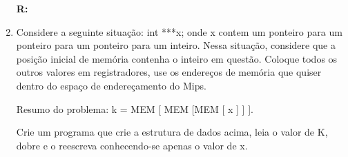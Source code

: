 \documentclass[a4paper,11pt]{article}
\begin{document}
\begin{enumerate}
        \textbf{R: }
        
        \newpage
    \item{Considere a seguinte situação:\newline
            int ***x;\newline
            onde x contem um ponteiro para um ponteiro para um ponteiro para um inteiro.\newline 
            Nessa situação, considere que a posição inicial de memória contenha o inteiro em questão.
            Coloque todos os outros valores em registradores, use os endereços de memória que quiser 
            dentro do espaço de endereçamento do Mips.

            Resumo do problema:\newline
            k = MEM [ MEM [MEM [  x ] ] ].

            Crie um programa que crie a estrutura de dados acima, leia o  valor de K, dobre e 
            o reescreva conhecendo-se apenas o valor de x.}

\end{enumerate}
\end{document}
